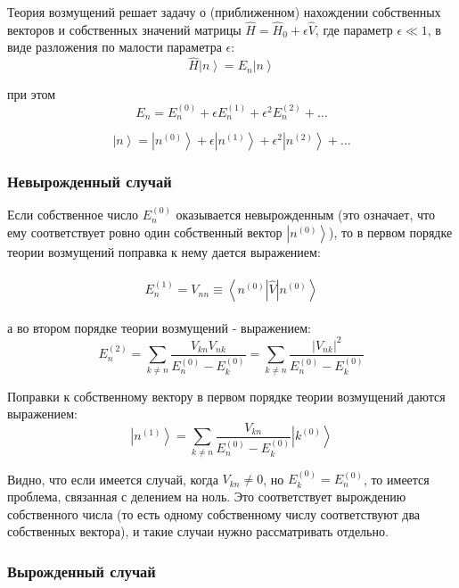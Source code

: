 \documentclass[a4paper,12pt]{article}
\begin{document}
\noindent
Теория возмущений решает задачу о (приближенном) нахождении собственных
векторов и собственных значений матрицы $\hat{H}=\hat{H}_{0}+\epsilon\hat{V}$,
где параметр $\epsilon\ll1$, в виде разложения по малости параметра
$\epsilon$:
\[
\hat{H}\left|n\right\rangle =E_{n}\left|n\right\rangle 
\]


\noindent
при этом 
\[
E_{n}=E_{n}^{(0)}+\epsilon E_{n}^{(1)}+\epsilon^{2}E_{n}^{(2)}+\dots
\]


\[
\left|n\right>=\left|n^{(0)}\right>+\epsilon\left|n^{(1)}\right>+\epsilon^{2}\left|n^{(2)}\right>+\dots
\]



\subsubsection*{Невырожденный случай}

Если собственное число $E_{n}^{(0)}$ оказывается невырожденным (это
означает, что ему соответствует ровно один собственный вектор $\left|n^{(0)}\right>$),
то в первом порядке теории возмущений поправка к нему дается выражением:


\paragraph{
\[
E_{n}^{(1)}=V_{nn}\equiv\left\langle n^{(0)}\left|\hat{V}\right|n^{(0)}\right\rangle 
\]
}

\noindent
а во втором порядке теории возмущений - выражением:
\[
E_{n}^{(2)}=\sum_{k\neq n}\frac{V_{kn}V_{nk}}{E_{n}^{(0)}-E_{k}^{(0)}}=\sum_{k\neq n}\frac{\left|V_{nk}\right|^{2}}{E_{n}^{(0)}-E_{k}^{(0)}}
\]


\noindent
Поправки к собственному вектору в первом порядке теории возмущений
даются выражением:
\[
\left|n^{(1)}\right\rangle =\sum_{k\neq n}\frac{V_{kn}}{E_{n}^{(0)}-E_{k}^{(0)}}\left|k^{(0)}\right\rangle 
\]


\noindent
Видно, что если имеется случай, когда $V_{kn}\neq0$, но $E_{k}^{(0)}=E_{n}^{(0)}$,
то имеется проблема, связанная с делением на ноль. Это соответствует
вырождению собственного числа (то есть одному собственному числу соответствуют
два собственных вектора), и такие случаи нужно рассматривать отдельно.


\subsubsection*{Вырожденный случай}
\end{document}
